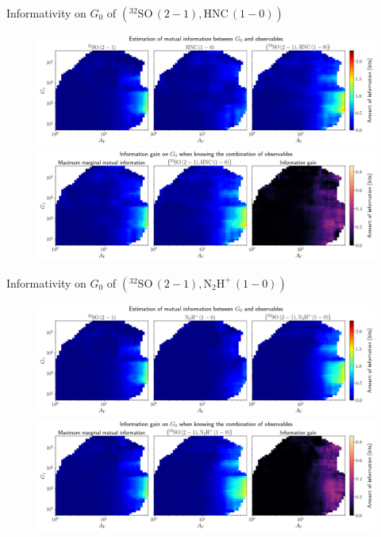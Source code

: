 \documentclass{beamer}
\begin{document}
\begin{frame}{Informativity on $G_0$ of $\left(\mathrm{^{32}SO\,(2-1)},\mathrm{HNC\,(1-0)}\right)$}
    \begin{figure}
        \centering
        \includegraphics[width=0.95\linewidth]{../mi/g0__32so21_hnc10_mi.png}
        \vfill
        \includegraphics[width=0.95\linewidth]{../mi/g0__32so21_hnc10_mi_gain.png}
    \end{figure}
\end{frame}

\begin{frame}{Informativity on $G_0$ of $\left(\mathrm{^{32}SO\,(2-1)},\mathrm{N_2H^+\,(1-0)}\right)$}
    \begin{figure}
        \centering
        \includegraphics[width=0.95\linewidth]{../mi/g0__32so21_n2hp10_mi.png}
        \vfill
        \includegraphics[width=0.95\linewidth]{../mi/g0__32so21_n2hp10_mi_gain.png}
    \end{figure}
\end{frame}
\end{document}
